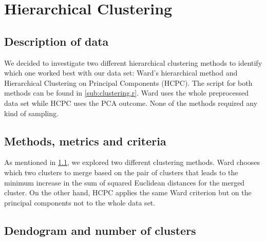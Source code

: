 

\section{Hierarchical Clustering}%
\label{sec:hierarchical_clustering}

\subsection{Description of data}%
\label{sub:description_data}


We decided to investigate two different hierarchical clustering methods to
identify which one worked best with our data set: Ward's hierarchical method and
Hierarchical Clustering on Principal Components (HCPC). The script for both methods
can be found in \cref{sub:clustering.r}. Ward uses
the whole preprocessed data set while HCPC uses the PCA outcome. None of the
methods required any kind of sampling.

\subsection{Methods, metrics and criteria}


As mentioned in \cref{sub:description_data}, we explored two different clustering methods.
Ward chooses which two clusters to merge based on the pair of clusters that leads to the
minimum increase in the sum of squared Euclidean distances for the merged cluster.
On the other hand, HCPC applies the same Ward criterion but on the principal components
not to the whole data set.


\subsection{Dendogram and number of clusters}%
\label{sub:dendogram}

